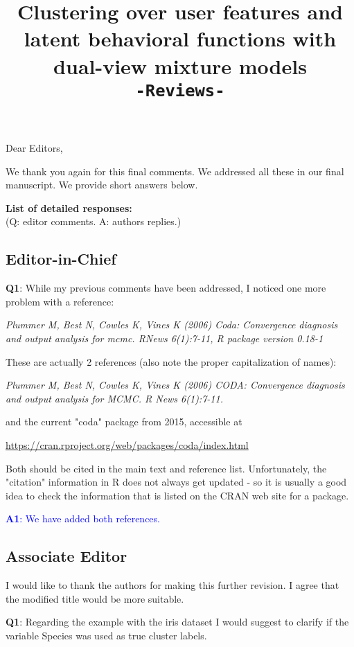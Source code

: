 \documentclass[]{article}
\title{Clustering over user features and latent behavioral functions with dual-view mixture models \\ \texttt{-Reviews-}}
\author{}
\begin{document}
	\date{}
	\maketitle
	
	Dear Editors,
	
	We thank you again for this final comments. We addressed all these in our final manuscript. We provide short answers below.
	
	\bigskip
	\noindent
	\textbf{List of detailed responses:}\\
	(Q: editor comments.
	A: authors replies.)
	\subsection*{Editor-in-Chief}
	
	\vspace{3mm}	
	 \textbf{Q1}: While my previous comments have been addressed, I noticed one more problem with a reference:

\textit{
Plummer M, Best N, Cowles K, Vines K (2006) Coda: Convergence diagnosis and output analysis for mcmc. RNews 6(1):7-11, R package version 0.18-1}

These are actually 2 references (also note the proper capitalization of names):

\textit{Plummer M, Best N, Cowles K, Vines K (2006) 
CODA: Convergence diagnosis and output analysis for MCMC. R News 6(1):7-11.}

and the current "coda" package from 2015, accessible at
 
\url{https://cran.rproject.org/web/packages/coda/index.html}

Both should be cited in the main text and reference list.
Unfortunately, the "citation" information in R does not always
get updated - so it is usually a good idea to check the
information that is listed on the CRAN web site for a package.
		
\textcolor{blue}{\textbf{A1}: We have added both references.}
	
	\subsection*{Associate Editor}
	I would like to thank the authors for making this further revision. I agree that the modified title would be more suitable.
		\vspace{3mm}

	\textbf{Q1}: Regarding the example with the iris dataset I would suggest to clarify if the variable Species was used as true cluster labels. 
	
\end{document}
